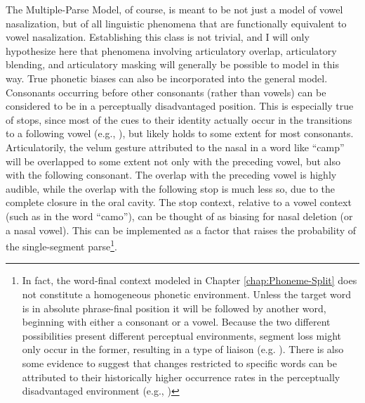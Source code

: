 The Multiple-Parse Model, of course, is meant to be not just a model
of vowel nasalization, but of all linguistic phenomena that are functionally
equivalent to vowel nasalization. Establishing this class is not trivial,
and I will only hypothesize here that phenomena involving articulatory
overlap, articulatory blending, and articulatory masking will generally
be possible to model in this way. True phonetic biases can also be
incorporated into the general model. Consonants occurring before other
consonants (rather than vowels) can be considered to be in a perceptually
disadvantaged position. This is especially true of stops, since most
of the cues to their identity actually occur in the transitions to
a following vowel (e.g., \citealt{liberman1954role}), but likely
holds to some extent for most consonants. Articulatorily, the velum
gesture attributed to the nasal in a word like “camp” will be
overlapped to some extent not only with the preceding vowel, but also
with the following consonant. The overlap with the preceding vowel
is highly audible, while the overlap with the following stop is much
less so, due to the complete closure in the oral cavity. The stop
context, relative to a vowel context (such as in the word “camo”),
can be thought of as biasing for nasal deletion (or a nasal vowel).
This can be implemented as a factor that raises the probability of
the single-segment parse\footnote{In fact, the word-final context modeled in Chapter \ref{chap:Phoneme-Split}
does not constitute a homogeneous phonetic environment. Unless the
target word is in absolute phrase-final position it will be followed
by another word, beginning with either a consonant or a vowel. Because
the two different possibilities present different perceptual environments,
segment loss might only occur in the former, resulting in a type of
liaison (e.g. \citealt{Tranel1981}). There is also some evidence
to suggest that changes restricted to specific words can be attributed
to their historically higher occurrence rates in the perceptually
disadvantaged environment (e.g., \citealt{brown2012discourse})}.

